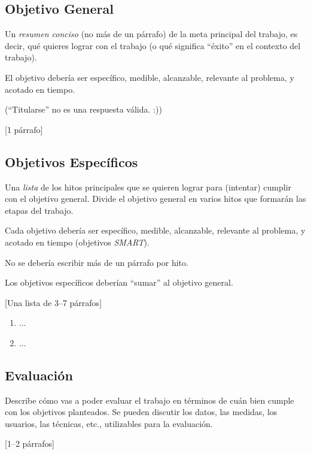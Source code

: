 \documentclass[guia]{upropuesta}
\begin{document}
\subsection*{Objetivo General}\label{sec:obj-g}

\begin{pauta}
Un \textit{resumen conciso} (no más de un párrafo) de la meta principal del trabajo, es decir, qué quieres lograr con el trabajo (o qué significa ``éxito'' en el contexto del trabajo).

El objetivo debería ser específico, medible, alcanzable, relevante al problema, y acotado en tiempo.

(``Titularse'' no es una respuesta válida. :))

[1 párrafo]
\end{pauta}

\subsection*{Objetivos Específicos}\label{sec:obj-e}

\begin{pauta}
Una \textit{lista} de los hitos principales que se quieren lograr para (intentar) cumplir con el objetivo general. Divide el objetivo general en varios hitos que formarán las etapas del trabajo.

Cada objetivo debería ser específico, medible, alcanzable, relevante al problema, y acotado en tiempo (objetivos \textit{SMART}).

No se debería escribir más de un párrafo por hito. 

Los objetivos específicos deberían ``sumar'' al objetivo general.

[Una lista de 3--7 párrafos]
\end{pauta}

\begin{enumerate}
\item ...
\item ...
\end{enumerate}

\subsection*{Evaluación}\label{sec:eval}

\begin{pauta}
Describe cómo vas a poder evaluar el trabajo en términos de cuán bien  cumple con los objetivos planteados. Se pueden discutir los datos, las medidas, los usuarios, las técnicas, etc., utilizables para la evaluación.

[1--2 párrafos]
\end{pauta}
\end{document}
